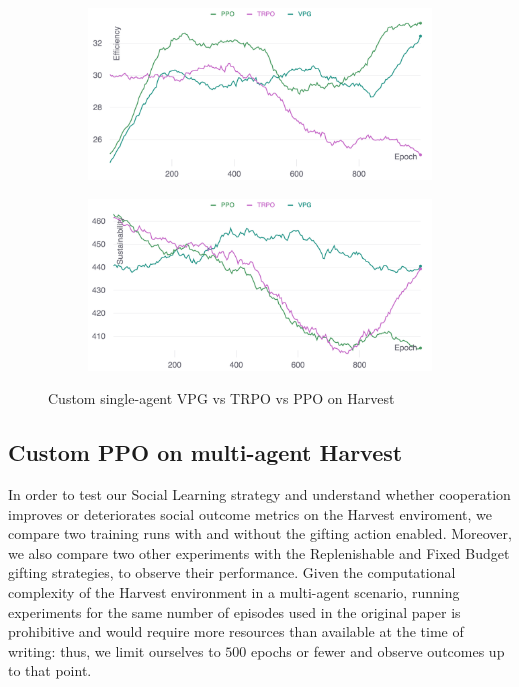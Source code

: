 \documentclass{article}
\begin{document}
\begin{figure}
  \centering
  \begin{subfigure}[b]{0.45\textwidth}
    \centering
    \includegraphics[width=\textwidth]{../assets/vpg-trpo-ppo-single-efficiency}
  \end{subfigure}
  \hfill
  \begin{subfigure}[b]{0.45\textwidth}
    \centering
    \includegraphics[width=\textwidth]{../assets/vpg-trpo-ppo-single-sustainability}
  \end{subfigure}
  \caption{Custom single-agent VPG vs TRPO vs PPO on Harvest}
  \label{fig:vpg-trpo-ppo-single}
\end{figure}

\subsection{Custom PPO on multi-agent Harvest}
In order to test our Social Learning strategy and understand whether cooperation improves or deteriorates social outcome metrics on the Harvest enviroment, we compare two training runs with and without the gifting action enabled. Moreover, we also compare two other experiments with the Replenishable and Fixed Budget gifting strategies, to observe their performance. Given the computational complexity of the Harvest environment in a multi-agent scenario, running experiments for the same number of episodes used in the original paper is prohibitive and would require more resources than available at the time of writing: thus, we limit ourselves to $500$ epochs or fewer and observe outcomes up to that point. 
\end{document}
